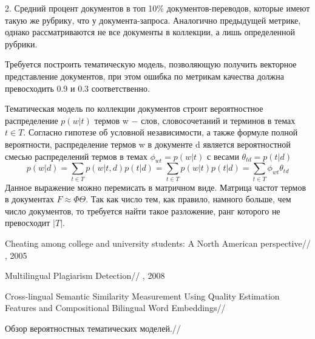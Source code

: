 \documentclass[12pt, twoside]{article}
\begin{document}
2. Средний процент документов в топ 10\% документов-переводов, которые имеют такую же рубрику, что у документа-запроса. Аналогично предыдущей метрике, однако рассматриваются не все документы в коллекции, а лишь определенной рубрики.

Требуется построить тематическую модель, позволяющую получить векторное представление документов, при этом ошибка по метрикам качества должна превосходить 0.9 и 0.3 соответственно.

Тематическая модель \cite{basetematic}  по коллекции документов строит вероятностное распределение $p(w|t)$ термов w $-$ слов, словосочетаний и терминов в темах $t \in T$. Согласно гипотезе об условной независимости, а также формуле полной вероятности, распределение термов w в документе d является вероятностной смесью распределений термов в темах $\phi_{wt} = p(w|t)$ с весами $\theta_{td}=p(t|d)$ $$p(w|d) = \sum_{t \in T} p(w|t, d)p(t|d) = \sum_{t \in T} p(w|t)p(t|d) =\sum_{t\in T}\phi_{wt}\theta_{td}$$
Данное выражение можно перемисать в матричном виде. Матрица частот термов в документах $F \approx \Phi \Theta$. Так как число тем, как правило, намного больше, чем число документов, то требуется найти такое разложение, ранг которого не превосходит $|T|$.


\begin{thebibliography}{4}

    Cheating among college and university students: A North American perspective//
    , 2005
    
    Multilingual Plagiarism Detection//
    , 2008
    
    Cross-lingual Semantic Similarity Measurement Using Quality Estimation Features and Compositional Bilingual Word Embeddings//
    
    Обзор вероятностных тематических моделей.//


	  
\end{thebibliography}
\end{document}
